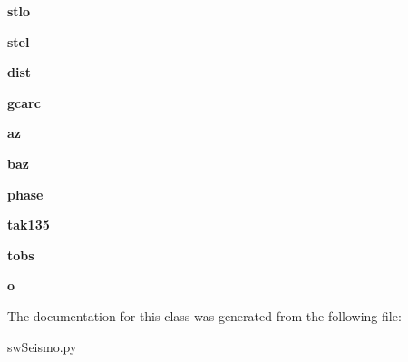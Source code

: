\begin{DoxyCompactItemize}
\item 
\hypertarget{classswSeismo_1_1Oat_abb8b615cfc359b4e317b4dc91a6b7f4d}{}{\bfseries stlo}\label{classswSeismo_1_1Oat_abb8b615cfc359b4e317b4dc91a6b7f4d}

\item 
\hypertarget{classswSeismo_1_1Oat_ad8dfb3d5e0462adc511481d6e8460ce4}{}{\bfseries stel}\label{classswSeismo_1_1Oat_ad8dfb3d5e0462adc511481d6e8460ce4}

\item 
\hypertarget{classswSeismo_1_1Oat_a52c8bac78a06ca475ac1151e03cfa090}{}{\bfseries dist}\label{classswSeismo_1_1Oat_a52c8bac78a06ca475ac1151e03cfa090}

\item 
\hypertarget{classswSeismo_1_1Oat_a74c9723fdafb58f6992c74fb8af45d4c}{}{\bfseries gcarc}\label{classswSeismo_1_1Oat_a74c9723fdafb58f6992c74fb8af45d4c}

\item 
\hypertarget{classswSeismo_1_1Oat_a16514959adbcab94644433e420728280}{}{\bfseries az}\label{classswSeismo_1_1Oat_a16514959adbcab94644433e420728280}

\item 
\hypertarget{classswSeismo_1_1Oat_ab133bc3d6bd69f8040fd31e7b00532e3}{}{\bfseries baz}\label{classswSeismo_1_1Oat_ab133bc3d6bd69f8040fd31e7b00532e3}

\item 
\hypertarget{classswSeismo_1_1Oat_a1b95c5fd5b193c532387099cae59d538}{}{\bfseries phase}\label{classswSeismo_1_1Oat_a1b95c5fd5b193c532387099cae59d538}

\item 
\hypertarget{classswSeismo_1_1Oat_aca328f143dea037b7b0d5963e6424c1a}{}{\bfseries tak135}\label{classswSeismo_1_1Oat_aca328f143dea037b7b0d5963e6424c1a}

\item 
\hypertarget{classswSeismo_1_1Oat_a28d3c825b653ee4d55ebe2cfe461872e}{}{\bfseries tobs}\label{classswSeismo_1_1Oat_a28d3c825b653ee4d55ebe2cfe461872e}

\item 
\hypertarget{classswSeismo_1_1Oat_a795bb6ab348f7f2d2e6b7cc88edb5898}{}{\bfseries o}\label{classswSeismo_1_1Oat_a795bb6ab348f7f2d2e6b7cc88edb5898}

\end{DoxyCompactItemize}


The documentation for this class was generated from the following file\+:\begin{DoxyCompactItemize}
\item 
sw\+Seismo.\+py\end{DoxyCompactItemize}
